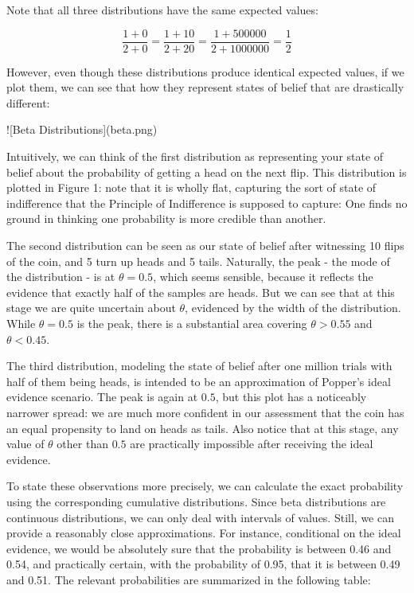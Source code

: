 Note that all three distributions have the same expected values:

\[\frac{1 + 0}{2 + 0}=\frac{1 + 10}{2 + 20}=\frac{1 + 500000}{2 + 1000000}=\frac{1}{2}\]

However, even though these distributions produce identical expected
values, if we plot them, we can see that how they represent states of
belief that are drastically different:

!{[}Beta Distributions{]}(beta.png)

Intuitively, we can think of the first distribution as representing your
state of belief about the probability of getting a head on the next
flip. This distribution is plotted in Figure 1: note that it is wholly
flat, capturing the sort of state of indifference that the Principle of
Indifference is supposed to capture: One finds no ground in thinking one
probability is more credible than another.

The second distribution can be seen as our state of belief after
witnessing 10 flips of the coin, and 5 turn up heads and 5 tails.
Naturally, the peak - the mode of the distribution - is at
\(\theta = 0.5\), which seems sensible, because it reflects the evidence
that exactly half of the samples are heads. But we can see that at this
stage we are quite uncertain about \(\theta\), evidenced by the width of
the distribution. While \(\theta = 0.5\) is the peak, there is a
substantial area covering \(\theta > 0.55\) and \(\theta < 0.45\).

The third distribution, modeling the state of belief after one million
trials with half of them being heads, is intended to be an approximation
of Popper's ideal evidence scenario. The peak is again at \(0.5\), but
this plot has a noticeably narrower spread: we are much more confident
in our assessment that the coin has an equal propensity to land on heads
as tails. Also notice that at this stage, any value of \(\theta\) other
than \(0.5\) are practically impossible after receiving the ideal
evidence.

To state these observations more precisely, we can calculate the exact
probability using the corresponding cumulative distributions. Since beta
distributions are continuous distributions, we can only deal with
intervals of values. Still, we can provide a reasonably close
approximations. For instance, conditional on the ideal evidence, we
would be absolutely sure that the probability is between 0.46 and 0.54,
and practically certain, with the probability of 0.95, that it is
between 0.49 and 0.51. The relevant probabilities are summarized in the
following table:

